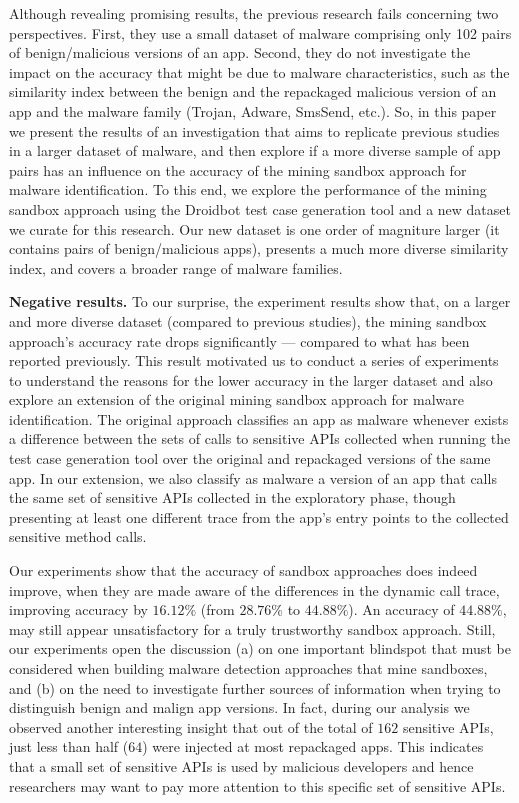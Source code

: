 Although revealing promising results, the previous research fails concerning two perspectives. First, they use a small dataset of malware comprising only 102 pairs of benign/malicious versions of an app. Second, they do not investigate the impact on the accuracy that might be due to malware characteristics, such as the similarity index between the benign and the repackaged malicious version of an app and the malware family (Trojan, Adware, SmsSend, etc.). So, in this paper we present the results of an investigation that aims to replicate previous studies~\cite{DBLP:conf/wcre/BaoLL18,DBLP:conf/scam/CostaMCMVBC20} in a larger dataset of malware, and then explore if a more diverse sample of app pairs has an influence on the accuracy of the mining sandbox approach for malware identification. To this end, we explore the performance of the mining sandbox approach using the Droidbot test case generation tool and a new dataset we curate for this research. Our new dataset is one order of magniture larger (it contains \apps pairs of benign/malicious apps), presents a much more diverse similarity index, and covers a broader range of malware families. 



{\bf Negative results.} To our surprise, the experiment results show that, on a larger and more diverse dataset (compared to previous studies), the mining sandbox approach's accuracy rate drops significantly --- compared to what has been reported previously. This result motivated us to conduct a series of experiments to understand the reasons for the lower accuracy in the larger dataset and also explore an extension of the original mining sandbox approach for malware identification. The original approach classifies an app as malware whenever exists a difference between the sets of calls to sensitive APIs collected when running the test case generation tool over the original and repackaged versions of the same app. In our extension, we also classify as malware a version of an app that calls the same set of sensitive APIs collected in the exploratory phase, though presenting at least one different trace from the app's entry points to the collected sensitive method calls.


Our experiments show that the accuracy of sandbox approaches does indeed improve, when they are made aware of the differences in the dynamic call trace, improving accuracy by $16.12\%$ (from $28.76\%$ to $44.88\%$). 
An accuracy of $44.88\%$, may still appear unsatisfactory for a truly trustworthy sandbox approach. Still, 
our experiments open the discussion (a) on one important blindspot that must be considered when building 
malware detection approaches that mine sandboxes, and (b) on the need to investigate further sources of information when trying to distinguish benign and malign app versions. 
In fact, during our analysis we observed another interesting insight that out of the total of $162$ sensitive APIs, just less than half ($64$) were injected at most repackaged apps. 
This indicates that a small set of sensitive APIs is used by malicious developers and hence 
researchers may want to pay more attention to this specific set of sensitive APIs.\\

